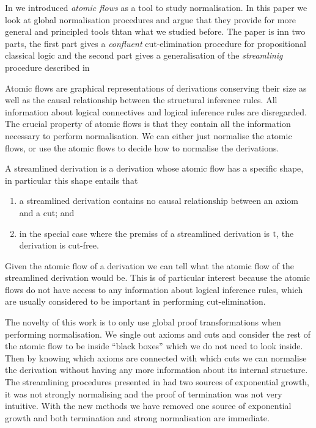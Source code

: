 \documentclass[a4paper]{amsart}
\theoremstyle{remark}
\theoremstyle{definition}
\begin{document}
In \cite{GuglGund:07:Normalis:lr} we introduced \emph{atomic flows} as a tool to study normalisation. In this paper we look at global normalisation procedures and argue that they provide for more general and principled tools thtan what we studied before. The paper is inn two parts, the first part gives a \emph{confluent} cut-elimination procedure for propositional classical logic and the second part gives a generalisation of the \emph{streamlinig} procedure described in \cite{GuglGund:07:Normalis:lr}

Atomic flows are graphical representations of derivations conserving their size as well as the causal relationship between the structural inference rules. All information about logical connectives and logical inference rules are disregarded. The crucial property of atomic flows is that they contain all the information necessary to perform normalisation. We can either just normalise the atomic flows, or use the atomic flows to decide how to normalise the derivations.

A streamlined derivation is a derivation whose atomic flow has a speciﬁc shape, in particular this shape entails that

\begin{enumerate}
\item a streamlined derivation contains no causal relationship between an axiom and a cut; and
\item in the special case where the premiss of a streamlined derivation is $\mathsf t$, the derivation is cut-free.
\end{enumerate}

Given the atomic flow of a derivation we can tell what the atomic flow of the streamlined derivation would be. This is of particular interest because the atomic flows do not have access to any information about logical inference rules, which are usually considered to be important in performing cut-elimination.

The novelty of this work is to only use global proof transformations when performing normalisation. We single out axioms and cuts and consider the rest of the atomic flow to be inside ``black boxes'' which we do not need to look inside. Then by knowing which axioms are connected with which cuts we can normalise the derivation without having any more information about its internal structure. The streamlining procedures presented in \cite{GuglGund:07:Normalis:lr} had two sources of exponential growth, it was not strongly normalising and the proof of termination was not very intuitive. With the new methods we have removed one source of exponential growth and both termination and strong normalisation are immediate.
\end{document}
